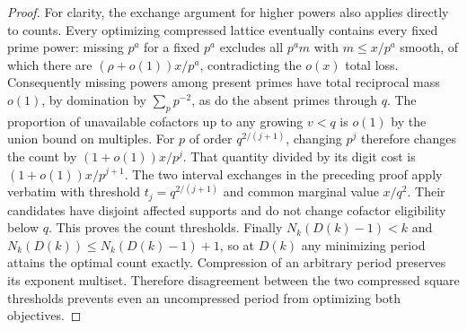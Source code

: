 \begin{proof}
For clarity, the exchange argument for higher powers also applies directly to counts. Every optimizing compressed lattice eventually contains every fixed prime power: missing $p^a$ for a fixed $p^a$ excludes all $p^a m$ with $m\le x/p^a$ smooth, of which there are $(\rho+o(1))x/p^a$, contradicting the $o(x)$ total loss. Consequently missing powers among present primes have total reciprocal mass $o(1)$, by domination by $\sum_p p^{-2}$, as do the absent primes through $q$. The proportion of unavailable cofactors up to any growing $v<q$ is $o(1)$ by the union bound on multiples. For $p$ of order $q^{2/(j+1)}$, changing $p^j$ therefore changes the count by $(1+o(1))x/p^j$. That quantity divided by its digit cost is $(1+o(1))x/p^{j+1}$. The two interval exchanges in the preceding proof apply verbatim with threshold $t_j=q^{2/(j+1)}$ and common marginal value $x/q^2$. Their candidates have disjoint affected supports and do not change cofactor eligibility below $q$. This proves the count thresholds. Finally $N_k(D(k)-1)<k$ and $N_k(D(k))\le N_k(D(k)-1)+1$, so at $D(k)$ any minimizing period attains the optimal count exactly. Compression of an arbitrary period preserves its exponent multiset. Therefore disagreement between the two compressed square thresholds prevents even an uncompressed period from optimizing both objectives.
\end{proof}
